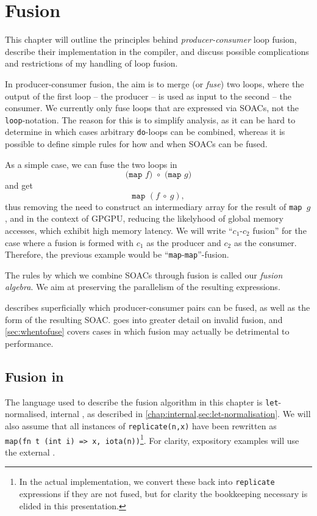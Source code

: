 \chapter{Fusion}
\label{chap:fusion}

This chapter will outline the principles behind
\textit{producer-consumer} loop fusion, describe their implementation
in the \LO{} compiler, and discuss possible complications and
restrictions of my handling of loop fusion.

In producer-consumer fusion, the aim is to merge (or \textit{fuse})
two loops, where the output of the first loop -- the producer -- is
used as input to the second -- the consumer.  We currently only fuse
loops that are expressed via SOACs, not the \texttt{loop}-notation.
The reason for this is to simplify analysis, as it can be hard to
determine in which cases arbitrary \texttt{do}-loops can be combined,
whereas it is possible to define simple rules for how and when SOACs
can be fused.

As a simple case, we can fuse the two loops in
\[
\texttt{(map~$f$)~$\circ$~(map~$g$)}
\]
and get
\[
\texttt{map~$(f~\circ~g)$},
\]
thus removing the need to construct an intermediary array for the
result of \texttt{map~$g$}, and in the context of GPGPU, reducing the
likelyhood of global memory accesses, which exhibit high memory
latency.  We will write ``$c_{1}$-$c_{2}$ fusion'' for the case where
a fusion is formed with $c_{1}$ as the producer and $c_{2}$ as the
consumer.  Therefore, the previous example would be
``\texttt{map}-\texttt{map}''-fusion.

The rules by which we combine SOACs through fusion is called our
\textit{fusion algebra}.  We aim at preserving the parallelism of the
resulting expressions.

 describes superficially which
producer-consumer pairs can be fused, as well as the form of the
resulting SOAC.   goes into greater detail on
invalid fusion, and \cref{sec:whentofuse} covers cases in which fusion
may actually be detrimental to performance.

\section{Fusion in \LO{}}
\label{sec:fusion-in-l0}

The language used to describe the fusion algorithm in this chapter is
\texttt{let}-normalised, internal \LO{}, as described in
\cref{chap:internal,sec:let-normalisation}.  We will also assume that
all instances of \texttt{replicate(n,x)} have been rewritten as
\texttt{map(fn~t~(int~i)~=>~x,~iota(n))}\footnote{In the actual
  implementation, we convert these back into \texttt{replicate}
  expressions if they are not fused, but for clarity the bookkeeping
  necessary is elided in this presentation.}.  For clarity, expository
examples will use the external \LO{}.

